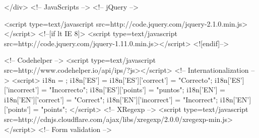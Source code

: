 \begin{rawhtml}
{    </div>
    <!-- JavaScripts -->
    <!-- jQuery -->
    
        <script type=text/javascript src=http://code.jquery.com/jquery-2.1.0.min.js></script>
        <!--[if lt IE 8]>
          <script type=text/javascript src=http://code.jquery.com/jquery-1.11.0.min.js></script>
        <![endif]-->
      
    <!-- Codehelper -->
    <script type=text/javascript src=http://www.codehelper.io/api/ips/?js></script>
    <!-- Internationalization -->
    <script>      i18n = {};
      i18n['ES'] = {}
      i18n['ES']['correct'] = "Correcto";
      i18n['ES']['incorrect'] = "Incorrecto";
      i18n['ES']['points'] = "puntos";
      i18n['EN'] = {}
      i18n['EN']['correct'] = "Correct";
      i18n['EN']['incorrect'] = "Incorrect";
      i18n['EN']['points'] = "points";
</script>
    <!-- XRegexp -->
    <script type=text/javascript src=http://cdnjs.cloudflare.com/ajax/libs/xregexp/2.0.0/xregexp-min.js></script>
    <!-- Form validation -->
}
\end{rawhtml}
